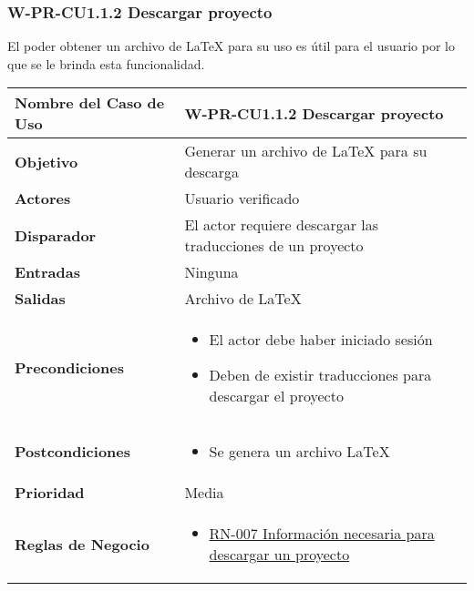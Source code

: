 \subsubsection{W-PR-CU1.1.2 Descargar proyecto}
El poder obtener un archivo de LaTeX para su uso es útil para el usuario por lo que se le brinda esta funcionalidad.

\begin{longtable}{|J{5cm}|J{10.3cm}|}
	\hline
	\textbf{Nombre del Caso de Uso} &
		W-PR-CU1.1.2 Descargar proyecto \\ \hline
	\textbf{Objetivo} &
		Generar un archivo de LaTeX para su descarga  \\ \hline
	\textbf{Actores} &
		Usuario verificado \\ \hline 
	\textbf{Disparador} & 
		El actor requiere descargar las traducciones de un proyecto \\ \hline 
	\textbf{Entradas} & 
		Ninguna \\ \hline 
	\textbf{Salidas} & 
		Archivo de LaTeX \\ \hline
	\textbf{Precondiciones} &
		\begin{itemize}
		    \item El actor debe haber iniciado sesión
		    \item Deben de existir traducciones para descargar el proyecto
		\end{itemize} \\ \hline
	\textbf{Postcondiciones} &
        \begin{itemize}
		    \item Se genera un archivo LaTeX
		\end{itemize} \\ \hline
	\textbf{Prioridad} & 
		Media \\ \hline
	\textbf{Reglas de Negocio} & 
		\begin{itemize}
		    \item \hyperref[RN007]{RN-007 Información necesaria para descargar un proyecto}
		\end{itemize} \\ \hline

\end{longtable}

